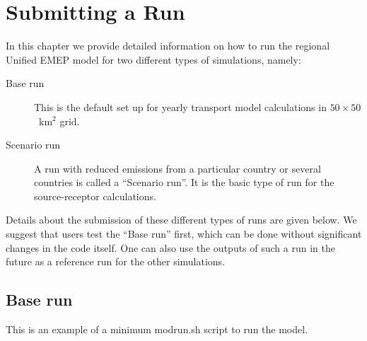 \chapter{Submitting a Run}
\label{ch:SubmitARun}

In this chapter we provide detailed information on how to run the
regional Unified EMEP model for two different types of
simulations, namely: 

\begin{description}

\item[Base run]
This is the default set up for yearly transport model calculations
in $50\times50$~km$^2$ grid. 
\item[Scenario run]
 A run with reduced emissions from a particular country or several
 countries is called 
a ``Scenario run''. It is the basic type of run for the source-receptor
calculations. 

\end{description}

\noindent
Details about the submission of these
different types of runs are given below. We suggest that users test
the ``Base run'' first, which can be done without significant changes in
the code itself. One can also use the outputs of such a run in the
future as a reference run for the other simulations.\\  
% 

\newpage
\section{Base run}

This is an example of a minimum modrun.sh script to run the model.

